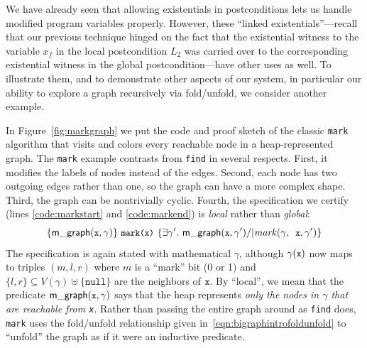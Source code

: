\documentclass[acmsmall,screen]{acmart}
\newcommand{\li}[1]{{\texttt{\small #1}}}
\newcommand{\tx}[1]{\text{#1}}
\newcommand{\p}[1]{\ensuremath{\mathsf{#1}}} \newcommand{\m}[1]{\ensuremath{\mathit{#1}}} \newcommand{\ma}[1]{\ensuremath{\mathcal{#1}}} \let\ramify\lightning
\begin{document}
\renewcommand{\tx}[1]{\text{#1}}

 
We have already seen that allowing existentials in postconditions lets us handle modified program
variables properly.  However, these ``linked existentials''---recall that our previous technique
hinged on the fact that the existential witness to the variable $x_f$ in the local postcondition
$L_2$ was carried over to the corresponding existential witness in the global postcondition---have
other uses as well.  To illustrate them, and to demonstrate other aspects of our system, in particular our ability to explore a graph recursively via fold/unfold, we consider another example.

In Figure~\ref{fig:markgraph} we put the code and proof sketch of the classic \li{mark} algorithm that visits and colors every reachable node in a heap-represented graph.  The \li{mark} example contrasts from \li{find} in several respects.  First, it modifies the labels of nodes instead of the edges.  Second, each node has two outgoing edges rather than one, so the graph can have a more complex shape.  Third, the graph can be nontrivially cyclic.  Fourth, the specification we certify (lines \ref{code:markstart} and \ref{code:markend}) is \emph{local} rather than \emph{global}:
\vspace*{-2.2ex}
\[
\{\p{m\_graph}(\li{x},\gamma)\}~\li{mark(x)}~\{\exists \gamma'.~ \p{m\_graph}(\li{x},\gamma') /| \m{mark}(\gamma, \li{x}, \gamma')\}
\vspace*{-1ex}
\]
The specification is again stated with mathematical $\gamma$, although $\gamma(\li{x})$ now maps to triples $(m,l,r)$ where $m$ is a ``mark'' bit (0 or 1) and $\{l,r\} \subseteq V(\gamma) \uplus \{\mathtt{null}\}$ are the neighbors of $\li{x}$.  By ``local'', we mean that the predicate $\p{m\_graph}(\li{x},\gamma)$ says that the heap represents \emph{only the nodes in $\gamma$ that are reachable from \li{x}}.  Rather than passing the entire graph around as \li{find} does, \li{mark} uses the fold/unfold relationship given in~\eqref{eqn:bigraphintrofoldunfold} to ``unfold'' the graph as if it were an inductive predicate.
\end{document}
